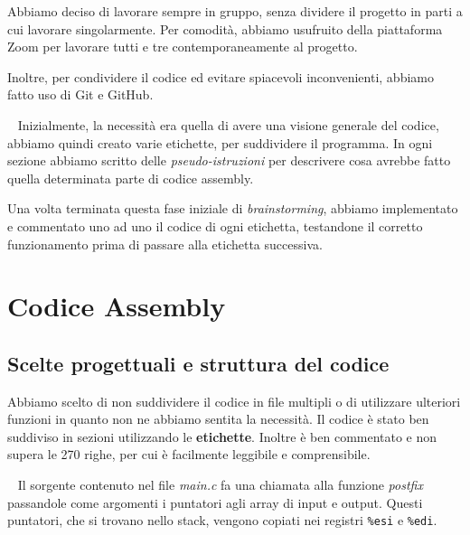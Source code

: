 \documentclass[a4paper,11pt,oneside]{book}
\begin{document}
Abbiamo deciso di lavorare sempre in gruppo, senza dividere il progetto in parti a cui lavorare singolarmente.
Per comodità, abbiamo usufruito della piattaforma Zoom per lavorare tutti e tre contemporaneamente al progetto.

Inoltre, per condividere il codice ed evitare spiacevoli inconvenienti, abbiamo fatto uso di Git e GitHub.

~\newline
Inizialmente, la necessità era quella di avere una visione generale del codice, abbiamo quindi creato varie etichette, per suddividere il programma.
In ogni sezione abbiamo scritto delle \emph{pseudo-istruzioni} per descrivere cosa avrebbe fatto quella determinata parte di codice assembly.

Una volta terminata questa fase iniziale di \emph{brainstorming}, abbiamo implementato e commentato uno ad uno il codice di ogni etichetta, testandone il corretto funzionamento 
prima di passare alla etichetta successiva.


\chapter{Codice Assembly}

\section{Scelte progettuali e struttura del codice}
Abbiamo scelto di non suddividere il codice in file multipli o di utilizzare ulteriori funzioni in quanto non ne abbiamo sentita la necessità. Il codice
è stato ben suddiviso in sezioni utilizzando le \textbf{etichette}. Inoltre è ben commentato e non supera le 270 righe, per cui è facilmente leggibile e comprensibile. 

~\newline
Il sorgente contenuto nel file \emph{main.c} fa una chiamata alla funzione \emph{postfix} passandole come argomenti i puntatori agli array di input e output.
Questi puntatori, che si trovano nello stack, vengono copiati nei registri \verb|%esi| e \verb|%edi|.
\end{document}
